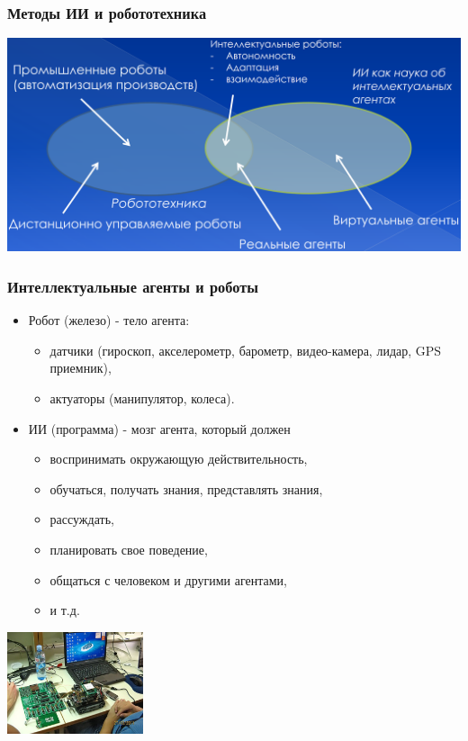 \documentclass[12pt]{beamer}
\begin{document}
\begin{frame}
	\frametitle{Методы ИИ и робототехника}
	\includegraphics[width=\textwidth]{airobots.png}
\end{frame}

\begin{frame}
\frametitle{Интеллектуальные агенты и роботы}
\begin{itemize}
	\item Робот (железо) - тело агента:
	\begin{itemize}
		\item датчики (гироскоп, акселерометр, барометр, видео-камера, лидар, GPS приемник),
		\item актуаторы (манипулятор, колеса).
	\end{itemize}
	\item ИИ (программа) - мозг агента, который должен
	\begin{itemize}
		\item воспринимать окружающую действительность,
		\item обучаться, получать знания, представлять знания,
		\item рассуждать,
		\item планировать свое поведение,
		\item общаться с человеком и другими агентами,
		\item и т.д.
	\end{itemize}
\end{itemize}
\centering
\includegraphics[width=0.3\textwidth]{schema.jpg}
\end{frame}
\end{document}
